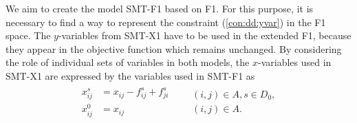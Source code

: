 We aim to create the model SMT-F1 based on F1. For this purpose, it is necessary to find a way to represent the constraint (\ref{con:dd:yvar}) in the F1 space. The $y$-variables from SMT-X1 have to be used in the extended F1, because they appear in the objective function which remains unchanged. By considering the role of individual sets of variables in both models, the $x$-variables used in SMT-X1 are expressed by the variables used in SMT-F1 as
\begin{align}
\label{eq:tr:xijsB}
\begin{aligned}
x^s_{ij}&= x_{ij}-f^s_{ij} + f^{s}_{ji}  \\
x^0_{ij}&= x_{ij} 
\end{aligned}
&&
\begin{aligned}
(i,j)\in A, s\in D_0, \\
 (i,j)\in A.
\end{aligned}
\end{align}



